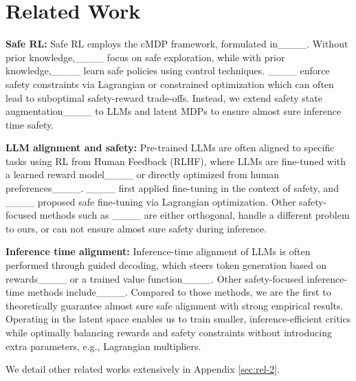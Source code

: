 \section{Related Work}
\textbf{Safe RL:} Safe RL employs the cMDP framework, formulated in____. Without prior knowledge,____ focus on safe exploration, while with prior knowledge,____ learn safe policies using control techniques. ____ enforce safety constraints via Lagrangian or constrained optimization which can often lead to suboptimal safety-reward trade-offs. Instead, we extend safety state augmentation____ to LLMs and latent MDPs to ensure almost sure inference time safety.


\textbf{LLM alignment and safety:} Pre-trained LLMs are often aligned to specific tasks using RL from Human Feedback (RLHF), where LLMs are fine-tuned with a learned reward model____ or directly optimized from human preferences____. ____ first applied fine-tuning in the context of safety, and ____ proposed safe fine-tuning via Lagrangian optimization. Other safety-focused methods such as ____ are either orthogonal, handle a different problem to ours, or can not ensure almost sure safety during inference. 



\textbf{Inference time alignment:} Inference-time alignment of LLMs is often performed through guided decoding, which steers token generation based on rewards____ or a trained value function____. Other safety-focused inference-time methods include____. Compared to those methods, we are the first to theoretically guarantee almost sure safe alignment with strong empirical results. Operating in the latent space enables us to train smaller, inference-efficient critics while optimally balancing rewards and safety constraints without introducing extra parameters, e.g., Lagrangian multipliers.

We detail other related
works extensively in Appendix \ref{sec:rel-2}.